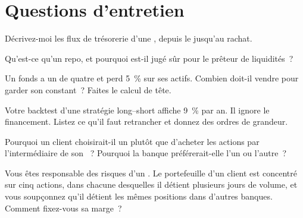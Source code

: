 \section{Questions d'entretien}

\begin{interviewq}\label{iq:m1:financing:1}
Décrivez-moi les flux de trésorerie d'une , depuis le
 jusqu'au rachat.
\end{interviewq}

\begin{interviewq}\label{iq:m1:financing:2}
Qu'est-ce qu'un repo, et pourquoi est-il jugé sûr pour le prêteur de liquidités~?
\end{interviewq}

\begin{interviewq}\label{iq:m1:financing:3}
Un fonds a un  de quatre et perd 5~\% sur ses actifs. Combien doit-il
vendre pour garder son  constant~? Faites le calcul de tête.
\end{interviewq}

\begin{interviewq}\label{iq:m1:financing:4}
Votre backtest d'une stratégie long--short affiche 9~\% par an. Il ignore
le financement. Listez ce qu'il faut retrancher et donnez des ordres de grandeur.
\end{interviewq}

\begin{interviewq}\label{iq:m1:financing:5}
Pourquoi un client choisirait-il un  plutôt que d'acheter les actions par l'intermédiaire de son
~? Pourquoi la banque préférerait-elle l'un ou l'autre~?
\end{interviewq}

\begin{interviewq}\label{iq:m1:financing:6}
Vous êtes responsable des risques d'un . Le portefeuille d'un client est
concentré sur cinq actions, dans chacune desquelles il détient plusieurs jours de
volume, et vous soupçonnez qu'il détient les mêmes positions dans d'autres banques. Comment fixez-vous
sa marge~?
\end{interviewq}
